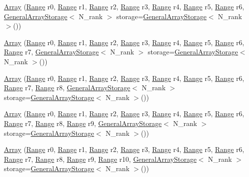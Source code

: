 \begin{DoxyCompactItemize}
\item 
\hyperlink{classArray_a1e8aaad12df193ef81b1b9eb25ccb61a}{Array} (\hyperlink{classRange}{Range} r0, \hyperlink{classRange}{Range} r1, \hyperlink{classRange}{Range} r2, \hyperlink{classRange}{Range} r3, \hyperlink{classRange}{Range} r4, \hyperlink{classRange}{Range} r5, \hyperlink{classRange}{Range} r6, \hyperlink{classGeneralArrayStorage}{General\+Array\+Storage}$<$ N\+\_\+rank $>$ storage=\hyperlink{classGeneralArrayStorage}{General\+Array\+Storage}$<$ N\+\_\+rank $>$())
\item 
\hyperlink{classArray_a3bee2faf05539d9eb7e279c4e83e3272}{Array} (\hyperlink{classRange}{Range} r0, \hyperlink{classRange}{Range} r1, \hyperlink{classRange}{Range} r2, \hyperlink{classRange}{Range} r3, \hyperlink{classRange}{Range} r4, \hyperlink{classRange}{Range} r5, \hyperlink{classRange}{Range} r6, \hyperlink{classRange}{Range} r7, \hyperlink{classGeneralArrayStorage}{General\+Array\+Storage}$<$ N\+\_\+rank $>$ storage=\hyperlink{classGeneralArrayStorage}{General\+Array\+Storage}$<$ N\+\_\+rank $>$())
\item 
\hyperlink{classArray_af626ea7167781de7907bad490fdf1c74}{Array} (\hyperlink{classRange}{Range} r0, \hyperlink{classRange}{Range} r1, \hyperlink{classRange}{Range} r2, \hyperlink{classRange}{Range} r3, \hyperlink{classRange}{Range} r4, \hyperlink{classRange}{Range} r5, \hyperlink{classRange}{Range} r6, \hyperlink{classRange}{Range} r7, \hyperlink{classRange}{Range} r8, \hyperlink{classGeneralArrayStorage}{General\+Array\+Storage}$<$ N\+\_\+rank $>$ storage=\hyperlink{classGeneralArrayStorage}{General\+Array\+Storage}$<$ N\+\_\+rank $>$())
\item 
\hyperlink{classArray_a14b17c0bb12d622128f65a6466c1e838}{Array} (\hyperlink{classRange}{Range} r0, \hyperlink{classRange}{Range} r1, \hyperlink{classRange}{Range} r2, \hyperlink{classRange}{Range} r3, \hyperlink{classRange}{Range} r4, \hyperlink{classRange}{Range} r5, \hyperlink{classRange}{Range} r6, \hyperlink{classRange}{Range} r7, \hyperlink{classRange}{Range} r8, \hyperlink{classRange}{Range} r9, \hyperlink{classGeneralArrayStorage}{General\+Array\+Storage}$<$ N\+\_\+rank $>$ storage=\hyperlink{classGeneralArrayStorage}{General\+Array\+Storage}$<$ N\+\_\+rank $>$())
\item 
\hyperlink{classArray_af0f46e946511589d826f875efe8fab8f}{Array} (\hyperlink{classRange}{Range} r0, \hyperlink{classRange}{Range} r1, \hyperlink{classRange}{Range} r2, \hyperlink{classRange}{Range} r3, \hyperlink{classRange}{Range} r4, \hyperlink{classRange}{Range} r5, \hyperlink{classRange}{Range} r6, \hyperlink{classRange}{Range} r7, \hyperlink{classRange}{Range} r8, \hyperlink{classRange}{Range} r9, \hyperlink{classRange}{Range} r10, \hyperlink{classGeneralArrayStorage}{General\+Array\+Storage}$<$ N\+\_\+rank $>$ storage=\hyperlink{classGeneralArrayStorage}{General\+Array\+Storage}$<$ N\+\_\+rank $>$())

\end{DoxyCompactItemize}
